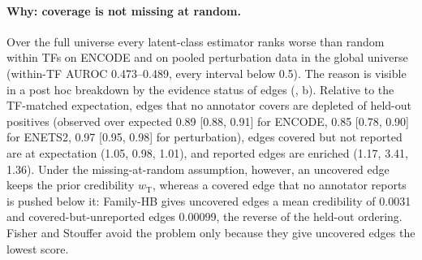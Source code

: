 \documentclass[11pt,a4paper]{article}
\begin{document}
\paragraph{Why: coverage is not missing at random.}
Over the full universe every latent-class estimator ranks worse than random within TFs on ENCODE and on pooled perturbation data in the global universe (within-TF AUROC 0.473--0.489, every interval below 0.5).
The reason is visible in a post hoc breakdown by the evidence status of edges (, b).
Relative to the TF-matched expectation, edges that no annotator covers are depleted of held-out positives (observed over expected 0.89 [0.88, 0.91] for ENCODE, 0.85 [0.78, 0.90] for ENETS2, 0.97 [0.95, 0.98] for perturbation), edges covered but not reported are at expectation (1.05, 0.98, 1.01), and reported edges are enriched (1.17, 3.41, 1.36).
Under the missing-at-random assumption, however, an uncovered edge keeps the prior credibility $w_{\mathrm{T}}$, whereas a covered edge that no annotator reports is pushed below it: Family-HB gives uncovered edges a mean credibility of 0.0031 and covered-but-unreported edges 0.00099, the reverse of the held-out ordering.
Fisher and Stouffer avoid the problem only because they give uncovered edges the lowest score.
\end{document}
